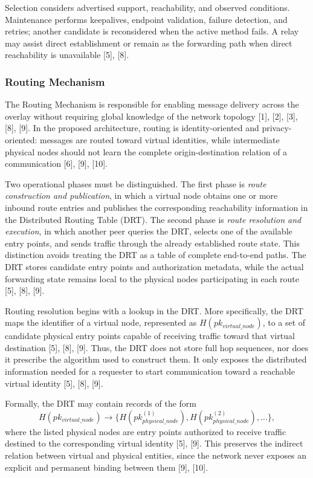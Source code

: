 \documentclass[12pt]{article}
\begin{document}
Selection considers advertised support, reachability, and observed conditions. Maintenance performs keepalives, endpoint validation, failure detection, and retries; another candidate is reconsidered when the active method fails. A relay may assist direct establishment or remain as the forwarding path when direct reachability is unavailable [5], [8].



\subsubsection{Routing Mechanism}

The Routing Mechanism is responsible for enabling message delivery across the overlay without requiring global knowledge of the network topology [1], [2], [3], [8], [9]. In the proposed architecture, routing is identity-oriented and privacy-oriented: messages are routed toward virtual identities, while intermediate physical nodes should not learn the complete origin-destination relation of a communication [6], [9], [10].

Two operational phases must be distinguished. The first phase is \textit{route construction and publication}, in which a virtual node obtains one or more inbound route entries and publishes the corresponding reachability information in the Distributed Routing Table (DRT). The second phase is \textit{route resolution and execution}, in which another peer queries the DRT, selects one of the available entry points, and sends traffic through the already established route state. This distinction avoids treating the DRT as a table of complete end-to-end paths. The DRT stores candidate entry points and authorization metadata, while the actual forwarding state remains local to the physical nodes participating in each route [5], [8], [9].

Routing resolution begins with a lookup in the DRT. More specifically, the DRT maps the identifier of a virtual node, represented as $H(pk_{virtual\_node})$, to a set of candidate physical entry points capable of receiving traffic toward that virtual destination [5], [8], [9]. Thus, the DRT does not store full hop sequences, nor does it prescribe the algorithm used to construct them. It only exposes the distributed information needed for a requester to start communication toward a reachable virtual identity [5], [8], [9].

\thesisdrttikz

Formally, the DRT may contain records of the form
\[
H(pk_{virtual\_node}) \rightarrow \{H(pk_{physical\_node}^{(1)}), H(pk_{physical\_node}^{(2)}), \dots\},
\]
where the listed physical nodes are entry points authorized to receive traffic destined to the corresponding virtual identity [5], [9]. This preserves the indirect relation between virtual and physical entities, since the network never exposes an explicit and permanent binding between them [9], [10].
\end{document}
